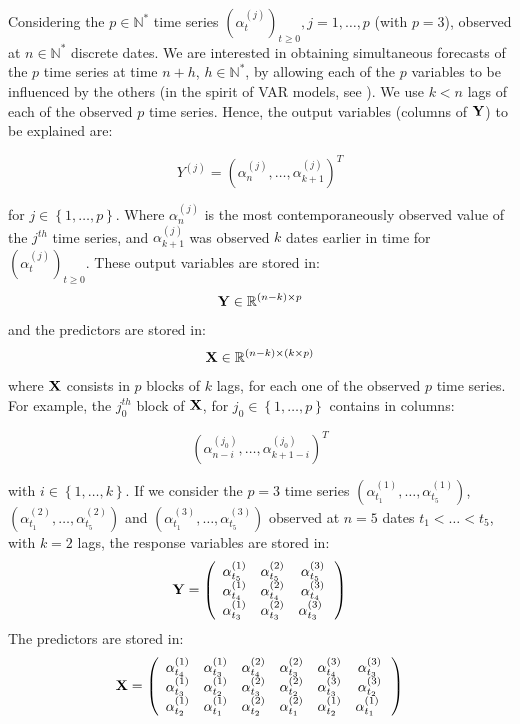 Considering the $p \in \mathbb{N}^*$ time series $(\alpha_t^{(j)})_{t \geq 0}, j = 1, \ldots, p$ (with $p = 3$),
observed at $n \in \mathbb{N}^*$ discrete dates. We are interested in
obtaining simultaneous forecasts of the $p$ time series at time $n+h$, $h \in
\mathbb{N}^*$, by allowing each of the $p$ variables to be influenced by the
others (in the spirit of VAR models, see \cite{lutkepohl2005new}). We use $k < n$ lags of each of the observed $p$ time series. Hence, the output variables (columns of ${\bf Y}$) to be explained are:

\begin{equation}
Y^{(j)} = \left(\alpha^{(j)}_n, \ldots, \alpha^{(j)}_{k+1} \right)^T
\end{equation}

for $j \in \left\lbrace 1, \ldots,
p \right\rbrace$. Where $\alpha^{(j)}_n$ is the most contemporaneously observed value
of the $j^{th}$ time series, and $\alpha^{(j)}_{k+1}$ was observed $k$ dates earlier
in time for $(\alpha^{(j)}_t)_{t \geq 0}$. These output variables are stored in: $$ {\bf Y} \in \mathbb{R}^{(n-k) \times p} $$ and the predictors are
stored in: $$ {\bf X} \in \mathbb{R}^{(n-k) \times (k \times p)} $$
where ${\bf X}$ consists in $p$ blocks of $k$ lags, for each one of the observed
$p$ time series. For example, the $j_0^{th}$ block of ${\bf X}$, for $j_0 \in
\left\lbrace 1, \ldots, p \right\rbrace$  contains in columns:

\begin{equation}
\left( \alpha^{(j_0)}_{n-i}, \ldots, \alpha^{(j_0)}_{k+1-i} \right)^T
\end{equation}

with $i \in
\left\lbrace 1, \ldots, k \right\rbrace$. If we consider the $p = 3$ time series $(\alpha^{(1)}_{t_1}, \ldots,  \alpha^{(1)}_{t_5})$, $(\alpha^{(2)}_{t_1}, \ldots,  \alpha^{(2)}_{t_5})$ and $(\alpha^{(3)}_{t_1}, \ldots,  \alpha^{(3)}_{t_5})$ observed at $n = 5$ dates $t_1 < \ldots < t_5$, with $k = 2$ lags,  the response variables are stored in:
$$
{\bf Y} = \left( {\begin{array}{ccc} \alpha^{(1)}_{t_5} &  \alpha^{(2)}_{t_5} &  \alpha^{(3)}_{t_5}\\ \alpha^{(1)}_{t_4} & \alpha^{(2)}_{t_4} & \alpha^{(3)}_{t_4} \\ \alpha^{(1)}_{t_3} & \alpha^{(2)}_{t_3} & \alpha^{(3)}_{t_3}\      \end{array} } \right)
$$
The predictors are stored in:
$$
{\bf X} = \left( {\begin{array}{cccccc} \alpha^{(1)}_{t_4} & \alpha^{(1)}_{t_3} & \alpha^{(2)}_{t_4} & \alpha^{(2)}_{t_3} & \alpha^{(3)}_{t_4} & \alpha^{(3)}_{t_3} \\ \alpha^{(1)}_{t_3} & \alpha^{(1)}_{t_2} & \alpha^{(2)}_{t_3} & \alpha^{(2)}_{t_2} & \alpha^{(3)}_{t_3} & \alpha^{(3)}_{t_2} \\ \alpha^{(1)}_{t_2} & \alpha^{(1)}_{t_1} & \alpha^{(2)}_{t_2} & \alpha^{(2)}_{t_1} & \alpha^{(1)}_{t_2} & \alpha^{(1)}_{t_1} \      \end{array} }\right)
$$



